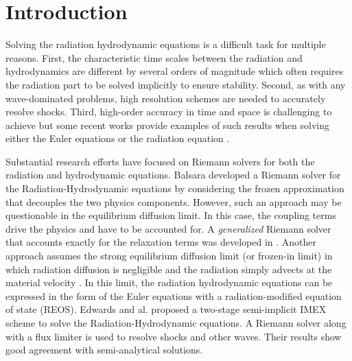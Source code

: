 \documentclass[review]{elsarticle}
\begin{document}
\section{Introduction}
\label{sec:section1}

Solving the radiation hydrodynamic equations is a difficult task for multiple reasons. First, the characteristic time scales between the radiation and hydrodynamics are different by several orders of magnitude which often requires the radiation part to be solved implicitly to ensure stability. Second, as with any wave-dominated problems, high resolution schemes are needed to accurately resolve shocks. Third, high-order accuracy in time and space is challenging to achieve but some recent works provide examples of such results when solving either the Euler equations \cite{Hussaini, jlg1, jlg2, Leveque} or the radiation equation \cite{nse_ragusa_wang,jcp_ragusa_wang}. 

Substantial research efforts have focused on Riemann solvers for both the radiation and hydrodynamic equations. Balsara \cite{Balsara} developed a Riemann solver for the Radiation-Hydrodynamic equations by considering the frozen approximation that decouples the two physics components. However, such an approach may be questionable in the equilibrium diffusion limit. In this case, the coupling terms drive the physics and have to be accounted for. A \emph{generalized} Riemann solver that accounts exactly for the relaxation terms was developed in \cite{LowrieMorelHittinger}. Another approach assumes the strong equilibrium diffusion limit (or frozen-in limit) in which radiation diffusion is negligible and the radiation simply advects at the material velocity \cite{Woodward}. In this limit, the radiation hydrodynamic equations can be expressed in the form of the Euler equations with a radiation-modified equation of state (REOS). 
%
Edwards and al. \cite{EdwardsMorelLowrie} proposed a two-stage semi-implicit IMEX scheme to solve the Radiation-Hydrodynamic equations. A Riemann solver along with a flux limiter is used to resolve shocks and other waves. Their results show good agreement with semi-analytical solutions. 
\end{document}
